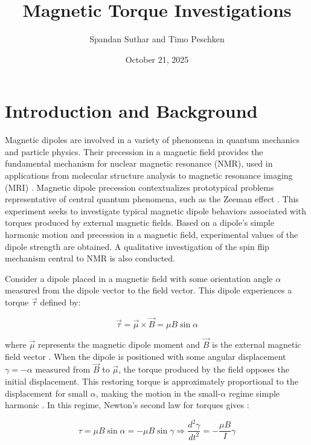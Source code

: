 \documentclass[11pt]{article}
\title{Magnetic Torque Investigations}
\author{Spandan Suthar and Timo Peschken}
\date{October 21, 2025}
\begin{document}
\maketitle

\section{Introduction and Background}

Magnetic dipoles are involved in a variety of phenomena in quantum
mechanics and particle physics. Their precession in a magnetic field
provides the fundamental mechanism for nuclear magnetic resonance
(NMR), used in applications from molecular structure analysis to
magnetic resonance imaging (MRI) \cite{harris, young}. Magnetic
dipole precession
contextualizes prototypical problems representative of central
quantum phenomena, such as the Zeeman effect \cite{harris}. This
experiment seeks
to investigate typical magnetic dipole behaviors associated with
torques produced by external magnetic fields. Based on a
dipole's simple harmonic motion and precession in a magnetic field,
experimental values of the dipole strength are obtained. A qualitative
investigation of the spin flip mechanism central to NMR is also
conducted.

\vspace{1em}

Consider a dipole placed in a magnetic field with some orientation
angle $\alpha$ measured from the dipole vector to the field vector. This dipole
experiences a torque $\vec \tau$ defined by:

\begin{equation}
  \vec{\tau} = \vec{\mu} \times \vec{B} = \mu B \sin \alpha
  \label{eq:magnetic_dipole_torque}
\end{equation}

where $\vec{\mu}$ represents the magnetic dipole moment and $\vec{B}$
is the external magnetic field vector \cite{young}. When the dipole
is positioned with some
angular displacement $\gamma = -\alpha$ measured from $\vec B$ to
$\vec \mu$, the torque produced by the field opposes
the initial displacement. This restoring torque is approximately proportional
to the displacement for small $\alpha$, making the motion in the
small-$\alpha$ regime simple harmonic \cite{diffeq}. In this regime, Newton's
second law for torques gives \cite{young}:

\begin{equation}
  \tau  = \mu B \sin \alpha  = - \mu B \sin \gamma \Rightarrow
  \frac{d^2\gamma}{dt^2} = -\frac{\mu B}{I} \gamma
\end{equation}
\end{document}
